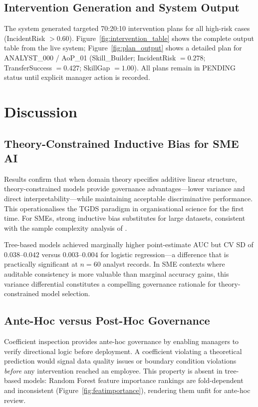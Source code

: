 \documentclass[11pt,a4paper]{article}
\begin{document}
\subsection{Intervention Generation and System Output}

The system generated targeted 70:20:10 intervention plans for all high-risk cases (IncidentRisk $> 0.60$). Figure~\ref{fig:intervention_table} shows the complete output table from the live system; Figure~\ref{fig:plan_output} shows a detailed plan for ANALYST\_000 / AoP\_01 (Skill\_Builder; IncidentRisk $= 0.278$; TransferSuccess $= 0.427$; SkillGap $= 1.00$). All plans remain in PENDING status until explicit manager action is recorded.

\section{Discussion}

\subsection{Theory-Constrained Inductive Bias for SME AI}

Results confirm that when domain theory specifies additive linear structure, theory-constrained models provide governance advantages---lower variance and direct interpretability---while maintaining acceptable discriminative performance. This operationalises the TGDS paradigm \citep{karpatne2017} in organisational science for the first time. For SMEs, strong inductive bias substitutes for large datasets, consistent with the sample complexity analysis of \citet{abumostafa2012}.

Tree-based models achieved marginally higher point-estimate AUC but CV SD of $0.038$--$0.042$ versus $0.003$--$0.004$ for logistic regression---a difference that is practically significant at $n = 60$ analyst records. In SME contexts where auditable consistency is more valuable than marginal accuracy gains, this variance differential constitutes a compelling governance rationale for theory-constrained model selection.

\subsection{Ante-Hoc versus Post-Hoc Governance}

Coefficient inspection provides ante-hoc governance by enabling managers to verify directional logic before deployment. A coefficient violating a theoretical prediction would signal data quality issues or boundary condition violations \emph{before} any intervention reached an employee. This property is absent in tree-based models: Random Forest feature importance rankings are fold-dependent and inconsistent (Figure~\ref{fig:featimportance}), rendering them unfit for ante-hoc review.
\end{document}
